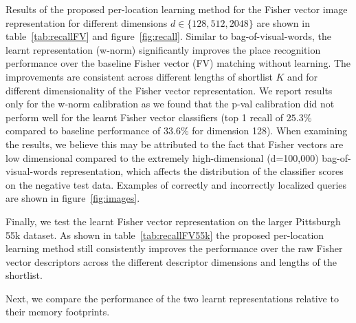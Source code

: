     Results of the proposed per-location learning method for the Fisher vector image representation for different dimensions $d\in\{128, 512, 2048\}$ 
    are shown in table~\ref{tab:recallFV} and figure~\ref{fig:recall}.
    Similar to bag-of-visual-words, the learnt representation (w-norm) significantly improves the place recognition performance over the baseline Fisher vector (FV) matching without learning. The improvements are consistent across different lengths of shortlist $K$ and for different dimensionality of the Fisher vector representation. 
    We report results only for the w-norm calibration as we found that the p-val calibration did not perform well for the learnt Fisher vector classifiers (top 1 recall of $25.3\%$ compared to baseline performance of $33.6\%$ for dimension 128). When examining the results, we believe this may be attributed to the fact that Fisher vectors are low dimensional compared to the extremely high-dimensional (d=100,000) bag-of-visual-words representation, which affects the distribution of the classifier scores on the negative test data. 
    Examples of correctly and incorrectly localized queries are shown in figure~\ref{fig:images}. 
    
        Finally, we test the learnt Fisher vector representation on the larger Pittsburgh 55k dataset. As shown in table~\ref{tab:recallFV55k} the proposed per-location learning method still consistently improves the performance over the raw Fisher vector descriptors across the different descriptor dimensions and lengths of the shortlist. 

\noindent
        Next, we compare the performance of the two learnt representations relative to their memory footprints.  

